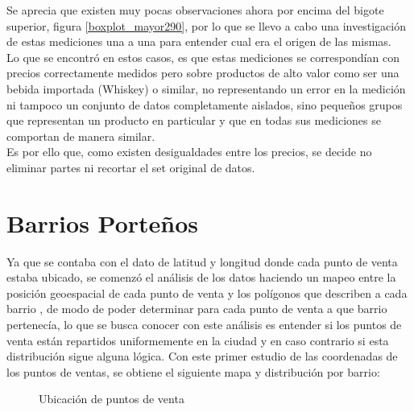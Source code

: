 Se aprecia que existen muy pocas observaciones ahora por encima del bigote superior, figura \ref{boxplot_mayor290}, por lo que se llevo a cabo una investigación de estas mediciones una a una para entender cual era el origen de las mismas.\\
Lo que se encontró en estos casos, es que estas mediciones se correspondían con precios correctamente medidos pero sobre productos de alto valor como ser una bebida importada (Whiskey) o similar, no representando un error en la medición ni tampoco un conjunto de datos completamente aislados, sino pequeños grupos que representan un producto en particular y que en todas sus mediciones se comportan de manera similar.\\
Es por ello que, como existen desigualdades entre los precios, se decide no eliminar partes ni recortar el set original de datos.







\section{Barrios Porteños}

Ya que se contaba con el dato de latitud y longitud donde cada punto de venta estaba ubicado, se comenzó el análisis de los datos haciendo un mapeo entre la posición geoespacial de cada punto de venta y los polígonos que describen a cada barrio \cite{barriosGeoJSON}, de modo de poder determinar para cada punto de venta a que barrio pertenecía, lo que se busca conocer con este análisis es entender si los puntos de venta están repartidos uniformemente en la ciudad y en caso contrario si esta distribución sigue alguna lógica. Con este primer estudio de las coordenadas de los puntos de ventas, se obtiene el siguiente mapa y distribución por barrio:

\begin{figure}[h]
\centering
{}%
\caption{Ubicación de puntos de venta}
\label{ptos_venta}
\end{figure}



